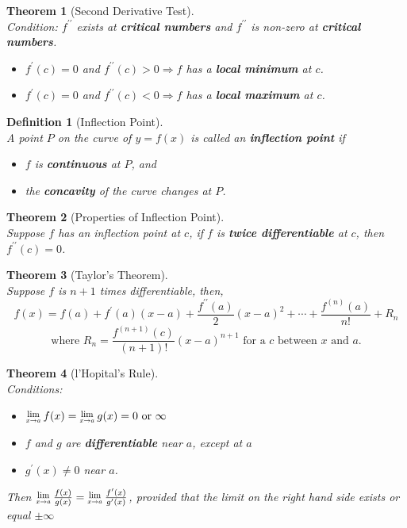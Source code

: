 \documentclass[12pt]{article}
\newcommand{\Lim}[1]{\raisebox{0.5ex}{\scalebox{0.8}{$\displaystyle \lim_{#1}\;$}}}
\newtheorem{definition}{Definition}[section]
\newtheorem{theorem}{Theorem}[section]
\theoremstyle{definition}
\begin{document}
\begin{theorem}[Second Derivative Test]
\hfill\\
\normalfont Condition: $f^{\prime\prime}$ exists at \textbf{critical numbers} and $f^{\prime\prime}$ is non-zero at \textbf{critical numbers}.
\begin{itemize}
\item $f^\prime (c)=0$ and $f^{\prime\prime}(c)>0 \Rightarrow f$ has a \textbf{local minimum} at $c$.
\item $f^\prime (c)=0$ and $f^{\prime\prime}(c)<0 \Rightarrow f$ has a \textbf{local maximum} at $c$.
\end{itemize}
\end{theorem}
\begin{definition}[Inflection Point]
\hfill\\
\normalfont A point $P$ on the curve of $y = f(x)$ is called an \textbf{inflection point} if
\begin{itemize}
\item  $f$ is \textbf{continuous} at $P$, and
\item  the \textbf{concavity} of the curve changes at $P$.
\end{itemize}
\end{definition}
\begin{theorem}[Properties of Inflection Point]
\hfill\\
\normalfont Suppose $f$ has an inflection point at $c$, if $f$ is \textbf{twice differentiable} at $c$, then $f^{\prime\prime}(c)=0$.
\end{theorem}
\begin{theorem}[Taylor's Theorem]
\hfill\\
\normalfont Suppose $f$ is $n+1$ times differentiable, then,
\[
f(x)=f(a)+f^\prime (a)(x-a) +\frac{f^{\prime\prime}(a)}{2}(x-a)^2 +\cdots + \frac{f^{(n)}(a)}{n!} +R_n\]
\[\text{where }R_n=\frac{f^{(n+1)}(c)}{(n+1)!}(x-a)^{n+1}\text{ for a }c\text{ between }x\text{ and }a.
\]
\end{theorem}
\begin{theorem}[l'Hopital's Rule]
\hfill\\
\normalfont Conditions:
\begin{itemize}
\item $\Lim{x\to a} f(x) =\Lim{x\to a}g(x)=0\text{ or }\infty$
\item $f$ and $g$ are \textbf{differentiable} near $a$, except at $a$
\item $g^\prime (x)\neq 0$ near $a$.
\end{itemize}
Then $\Lim{x\to a}\frac{f(x)}{g(x)}=\Lim{x\to a}\frac{f^\prime (x)}{g^\prime (x)}$, provided that the limit on the right hand side exists or equal $\pm\infty$
\end{theorem}
\clearpage
\end{document}
